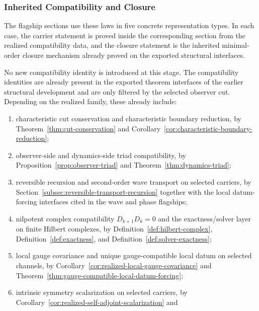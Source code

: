 \subsubsection{Inherited Compatibility and Closure}

The flagship sections use these laws in five concrete representation
types. In each case, the carrier statement is proved inside the corresponding
section from the realized compatibility data, and the closure statement is the
inherited minimal-order closure mechanism already proved on the exported
structural interfaces.

\begin{remark}
\label{rem:compatibility-is-inherited}
No new compatibility identity is introduced at this stage. The compatibility
identities are already present in the exported theorem interfaces of
the earlier structural development and are only filtered by the selected
observer cut. Depending on
the realized family, these already include:
\begin{enumerate}[label=(\roman*), leftmargin=2em, itemsep=0.2em]
\item characteristic cut conservation and characteristic boundary reduction, by
      Theorem~\ref{thm:cut-conservation} and
      Corollary~\ref{cor:characteristic-boundary-reduction};
\item observer-side and dynamics-side triad compatibility, by
      Proposition~\ref{prop:observer-triad} and
      Theorem~\ref{thm:dynamics-triad};
\item reversible recursion and second-order wave transport on selected
      carriers, by
      Section~\ref{subsec:reversible-transport-recursion} together with the
      local datum-forcing interfaces cited in the wave and phase flagships;
\item nilpotent complex compatibility \(D_{k+1}D_k=0\) and the exactness/solver
      layer on finite Hilbert complexes, by
      Definition~\ref{def:hilbert-complex},
      Definition~\ref{def:exactness}, and
      Definition~\ref{def:solver-exactness};
\item local gauge covariance and unique gauge-compatible local datum on
      selected channels, by
      Corollary~\ref{cor:realized-local-gauge-covariance} and
      Theorem~\ref{thm:gauge-compatible-local-datum-forcing};
\item intrinsic symmetry scalarization on selected carriers, by
      Corollary~\ref{cor:realized-self-adjoint-scalarization} and

\end{enumerate}
\end{remark}
